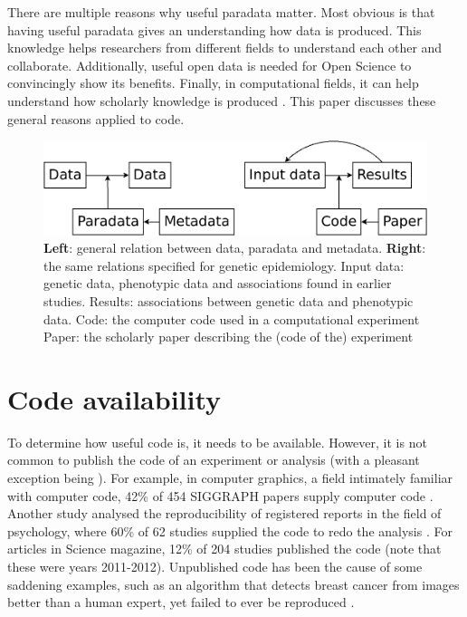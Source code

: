 There are multiple reasons why useful paradata matter. 
Most obvious is that having useful paradata gives an understanding how
data is produced.
This knowledge helps researchers from different fields to understand each other
and collaborate.
Additionally, useful open data is needed for Open Science to convincingly show
its benefits.
Finally, in computational fields, 
it can help understand how scholarly knowledge is produced
\cite{huvila2022improving}.
This paper discusses these general reasons applied to code.

\begin{figure}[!htbp]
  \centering
  \includegraphics[width=\linewidth]{figure_1.png}
  \caption{
    \textbf{Left}: general relation between data, paradata and metadata.
    \textbf{Right}: the same relations specified for genetic epidemiology.
    Input data: genetic data, phenotypic data and associations
    found in earlier studies.
    Results: associations between genetic data and phenotypic data.
    Code: the computer code used in a computational experiment
    Paper: the scholarly paper describing the (code of the) experiment
  }
  \label{fig:figure_1}
\end{figure}

\section{Code availability}\label{sec:code-availability}

To determine how useful code is, it needs to be available.
However, it is not common to publish the code of an experiment or analysis 
\cite{stodden2011trust,read2015sizing} (with a pleasant exception 
being \cite{conesa2019making}).
For example, in computer graphics, 
a field intimately familiar with computer code,
42\% of 454 SIGGRAPH papers supply computer code \cite{bonneel2020code}.
Another study analysed the reproducibility of registered reports
in the field of psychology, 
where 60\% of 62 studies supplied the code 
to redo the analysis \cite{obels2020analysis}.
For articles in Science magazine, 12\% of 204
studies published the code \cite{stodden2018empirical} 
(note that these were years 2011-2012).
Unpublished code has been the cause of some saddening examples,
such as an algorithm that detects breast cancer from images 
better than a human expert, 
yet failed to ever be reproduced \cite{haibe2020importance}.

